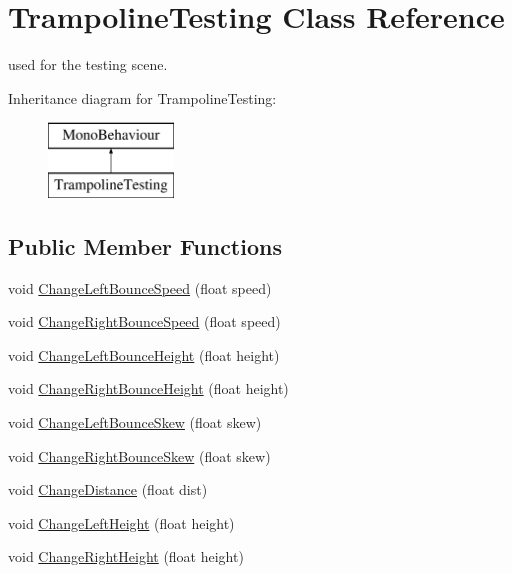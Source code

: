 \hypertarget{class_trampoline_testing}{}\section{Trampoline\+Testing Class Reference}
\label{class_trampoline_testing}


used for the testing scene.  


Inheritance diagram for Trampoline\+Testing\+:\begin{figure}[H]
\begin{center}
\leavevmode
\includegraphics[height=2.000000cm]{class_trampoline_testing}
\end{center}
\end{figure}
\subsection*{Public Member Functions}
\begin{DoxyCompactItemize}
\item 
void \mbox{\hyperlink{class_trampoline_testing_a293dac8cd3d82790db229a2e1516000e}{Change\+Left\+Bounce\+Speed}} (float speed)
\item 
void \mbox{\hyperlink{class_trampoline_testing_ae1ca7c78407117d7bd5e88fd4f119996}{Change\+Right\+Bounce\+Speed}} (float speed)
\item 
void \mbox{\hyperlink{class_trampoline_testing_a19ec0e271e9bb6273a3fd7602d7c8354}{Change\+Left\+Bounce\+Height}} (float height)
\item 
void \mbox{\hyperlink{class_trampoline_testing_abd2ed08a76b386d9cdb0e8e3bddf9803}{Change\+Right\+Bounce\+Height}} (float height)
\item 
void \mbox{\hyperlink{class_trampoline_testing_a0addce0592f7d385d8e45544216464dc}{Change\+Left\+Bounce\+Skew}} (float skew)
\item 
void \mbox{\hyperlink{class_trampoline_testing_acd918a942955538955286aebec463e5c}{Change\+Right\+Bounce\+Skew}} (float skew)
\item 
void \mbox{\hyperlink{class_trampoline_testing_a56760ba228b6b5a6ed38b141966fc5d7}{Change\+Distance}} (float dist)
\item 
void \mbox{\hyperlink{class_trampoline_testing_a78b898a3ef7dff4789b7fc178115e90b}{Change\+Left\+Height}} (float height)
\item 
void \mbox{\hyperlink{class_trampoline_testing_a1483781ace5dea7dbed1f2a993691019}{Change\+Right\+Height}} (float height)
\end{DoxyCompactItemize}
